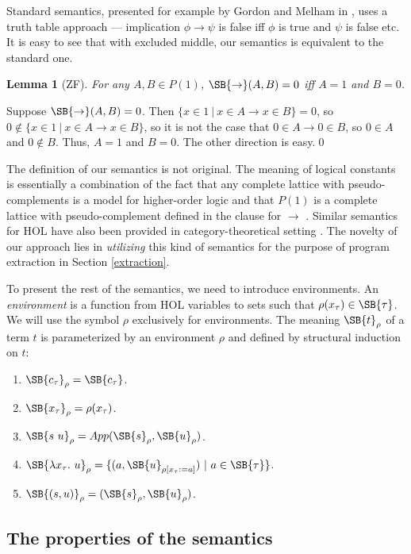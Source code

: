 \documentclass{LMCS}
\newtheorem{lemma}[thm]{Lemma}
\newcommand\rimpl{\ensuremath{\to}}
\begin{document}
Standard semantics, presented for example by Gordon and Melham in \cite{GM93}, uses a
truth table approach --- implication $\phi \to \psi$ is false iff
$\phi$ is true and $\psi$ is false etc. It is easy to see that with excluded
middle, our semantics is equivalent to the standard one.

\begin{lemma}[ZF]
For any $A, B \in P(1)$, $\SB{\to}(A, B)= 0$ iff $A = 1$ and $B = 0$. 
\end{lemma}
\proof
Suppose $\SB{\to}(A, B) = 0$. Then $\{ x \in 1\ | \ x \in A \to x \in B \} =
0$, so $0 \notin \{ x \in 1\ | \ x \in A \to x \in B \}$, so it is not the
case that $0 \in A \to 0 \in B$, so $0 \in A$ and $0 \notin B$. Thus, $A =
1$ and $B = 0$. The other direction is easy.\qed

The definition of our semantics is not original. The meaning of logical constants is essentially a
combination of the fact that any complete lattice with pseudo-complements is a model for higher-order
logic and that $P(1)$ is a complete lattice with pseudo-complement defined
in the clause for $\rimpl$ \cite{Rasiowa}. Similar semantics for HOL have also been provided in 
category-theoretical setting \cite{LS86}. The novelty of our approach lies
in \emph{utilizing} this kind of semantics for the purpose of program extraction in
Section \ref{extraction}. 

To present the rest of the semantics, we need to introduce environments. An
\emph{environment} is a function from HOL variables to sets such that
$\rho(x_\tau) \in \SB{\tau}$. We will use the symbol $\rho$ exclusively for environments.
The meaning $\SB{t}_\rho$ of a term $t$ is parameterized by an environment
$\rho$ and defined by structural induction on $t$:

\begin{enumerate}[$\bullet$]
\item $\SB{c_\tau}_\rho = \SB{c_\tau}$. 
\item $\SB{x_\tau}_\rho = \rho(x_\tau)$.
\item $\SB{s\ u}_\rho = App(\SB{s}_\rho, \SB{u}_\rho)$.
\item $\SB{\lambda x_\tau.\ u}_\rho = \{ (a, \SB{u}_{\rho[x_\tau:=a]})\ |\ a \in
\SB{\tau} \}$.
\item $\SB{(s, u)}_\rho = (\SB{s}_\rho, \SB{u}_\rho)$. 
\end{enumerate}

\subsection{The properties of the semantics}
\end{document}
